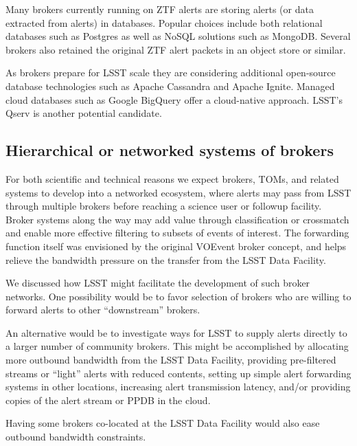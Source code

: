 Many brokers currently running on  {ZTF} alerts are storing alerts (or data extracted from alerts) in databases.
Popular choices include both relational databases such as Postgres as well as NoSQL solutions such as MongoDB.
Several brokers also retained the original  {ZTF} alert packets in an object store or similar.

As brokers prepare for   LSST scale they are considering additional open-source database technologies such as Apache Cassandra and Apache Ignite.
Managed cloud databases such as Google BigQuery offer a cloud-native approach. 
LSST's  {Qserv} \citep{2011Wang:2011:QDS:2063348.2063364} is another potential candidate.

\subsection{Hierarchical or networked systems of brokers}

For both scientific and technical reasons we expect brokers, TOMs, and related systems to develop into a networked ecosystem, where alerts may pass from   LSST through multiple brokers before reaching a science user or followup facility.
Broker systems along the way may add value through classification or crossmatch and enable more effective filtering to subsets of events of interest.
The forwarding function itself was envisioned by the original VOEvent broker concept, and helps relieve the bandwidth pressure on the transfer from the   LSST Data Facility.

We discussed how   LSST might facilitate the development of such broker networks.
One possibility would be to favor selection of brokers who are willing to forward alerts to other ``downstream'' brokers.

An alternative would be to investigate ways for   LSST to supply alerts directly to a larger number of community brokers.
This might be accomplished by allocating more outbound bandwidth from the   LSST Data Facility, providing pre-filtered streams or ``light'' alerts with reduced contents, setting up simple alert forwarding systems in other locations, increasing alert transmission latency, and/or providing copies of the alert stream or  {PPDB} in the cloud.

Having some brokers co-located at  the   LSST Data Facility would also ease outbound bandwidth constraints.


